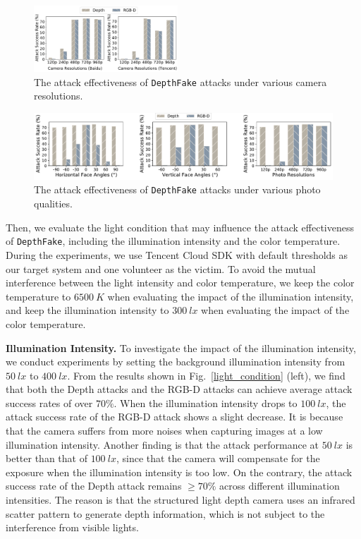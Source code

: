 \begin{figure}[pt]
	\centerline{\includegraphics[width = 0.48\textwidth]{figures/camera_resolution.pdf}}
	\vspace{-0.05in}
	\caption{The attack effectiveness of \texttt{DepthFake} attacks under various camera resolutions.}
	\label{camera_resolution}
	\vspace{-0.15in}
\end{figure}


\begin{figure}[pt]
	\centerline{\includegraphics[width = \textwidth]{figures/photo_quality.pdf}}
	\vspace{-0.15in}
	\caption{The attack effectiveness of \texttt{DepthFake} attacks under various photo qualities. }
	\label{photo_quality}
	\vspace{-0.15in}
\end{figure}


Then, we evaluate the light condition that may influence the attack effectiveness of \texttt{DepthFake}, including the illumination intensity and the color temperature. During the experiments, we use Tencent Cloud SDK with default thresholds as our target system and one volunteer as the victim.  
To avoid the mutual interference between the light intensity and color temperature, we keep the color temperature to $6500~K$ when evaluating the impact of the illumination intensity, and keep the illumination intensity to $300~lx$ when evaluating the impact of the color temperature.

\textbf{Illumination Intensity.} To investigate the impact of the illumination intensity, we conduct  experiments by setting the background illumination intensity from $50~lx$ to $400~lx$.
From the results shown in Fig.~\ref{light_condition} (left), we find that both the Depth attacks and the RGB-D attacks can achieve average attack success rates of over $70\%$.
When the illumination intensity drops to $100~lx$, the attack success rate of the RGB-D attack shows a slight decrease. 
It is because  that the camera suffers from more noises when capturing images at a low illumination intensity. Another finding is that the attack performance at $50~lx$ is better than that of $100~lx$, since that the camera will compensate for the exposure when the illumination intensity is too low.
On the contrary, the attack success rate of the Depth attack remains $\geq$$70\%$ across different illumination intensities. The reason is that the structured light depth camera uses an infrared scatter pattern to generate depth information, which is not subject to the interference from visible lights.


